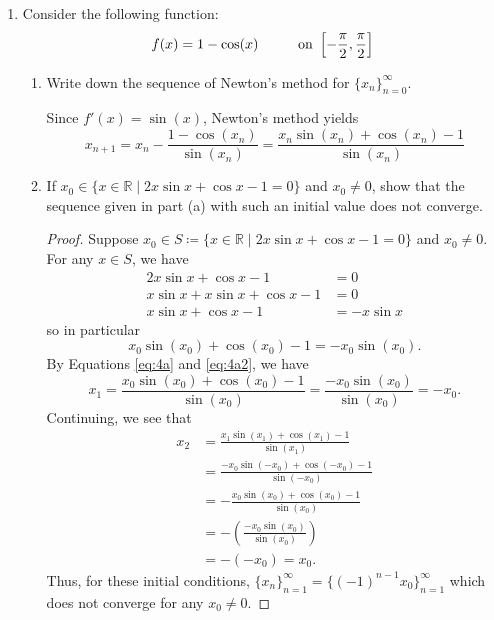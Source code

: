\documentclass[11pt,oneside,english,reqno]{amsart}
\theoremstyle{definition}
\newcommand{\pspace}{\hspace{10mm}}
\newcommand{\MB}[1]{\mathbb{#1}}
\newcommand{\1}{\mathbbm{1}}
\begin{document}
\begin{enumerate}[leftmargin=*]
\vfill
\pagebreak





















\item Consider the following function:
\[
f(x)=1-\cos(x)\pspace\text{on }\left[-\frac{\pi}{2},\frac{\pi}{2}\right]
\]

\begin{enumerate}
\itemsep5mm
\item Write down the sequence of Newton's method for $\{x_n\}_{n=0}^\infty$.

Since $f'(x)=\sin(x)$, Newton's method yields
\begin{equation}\label{eq:4a}
x_{n+1}=x_n-\frac{1-\cos(x_n)}{\sin(x_n)}=\frac{x_n\sin(x_n)+\cos(x_n)-1}{\sin(x_n)}
\end{equation}

\item If $x_0\in\{x\in\MB{R}\mid 2x\sin x+\cos x-1=0\}$ and $x_0\neq0$, show that the sequence given in part (a) with such an initial value does not converge.

\begin{proof}
Suppose $x_0\in S\coloneqq\{x\in\MB{R}\mid 2x\sin x+\cos x-1=0\}$ and $x_0\neq0$. For any $x\in S$, we have
\begin{align*}
2x\sin x+\cos x-1&=0\\[2mm]
x\sin x +x\sin x+\cos x-1&=0\\[2mm]
x\sin x+\cos x-1&=-x\sin x
\end{align*}
so in particular
\begin{equation} \label{eq:4a2}
x_0\sin(x_0)+\cos(x_0)-1=-x_0\sin(x_0).
\end{equation}
By Equations \ref{eq:4a} and \ref{eq:4a2}, we have
\[
x_1=\frac{x_0\sin(x_0)+\cos(x_0)-1}{\sin(x_0)}=\frac{-x_0\sin(x_0)}{\sin(x_0)}=-x_0.
\]
Continuing, we see that
\begin{align*}
x_2&=\frac{x_1\sin(x_1)+\cos(x_1)-1}{\sin(x_1)}\\[2mm]
&=\frac{-x_0\sin(-x_0)+\cos(-x_0)-1}{\sin(-x_0)}\\[2mm]
&=-\frac{x_0\sin(x_0)+\cos(x_0)-1}{\sin(x_0)}\\[2mm]
&=-\left(\frac{-x_0\sin(x_0)}{\sin(x_0)}\right)\\[2mm]
&=-(-x_0)=x_0.
\end{align*}
Thus, for these initial conditions, $\{x_n\}_{n=1}^\infty=\{(-1)^{n-1}x_0\}_{n=1}^\infty$ which does not converge for any $x_0\neq0$.
\end{proof}
\end{enumerate}


\end{enumerate}
\end{document}

